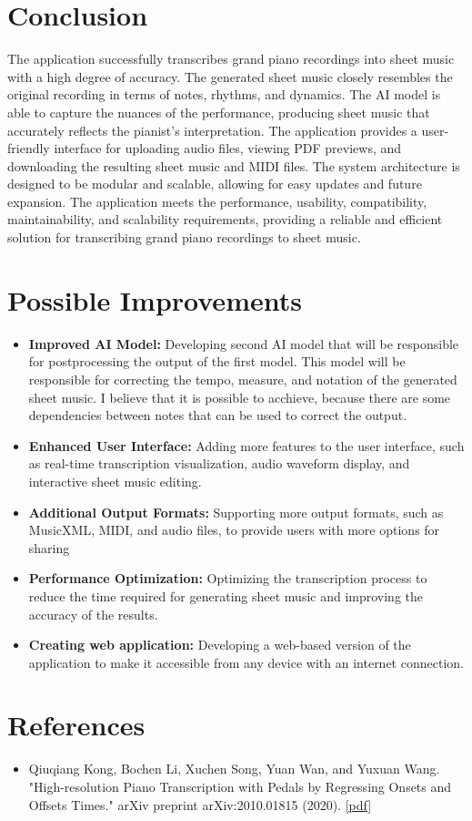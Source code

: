\documentclass{article}
\begin{document}
\section{Conclusion}
The application successfully transcribes grand piano recordings into sheet music with a high degree of accuracy. The generated sheet music closely resembles the original recording in terms of notes, rhythms, and dynamics. The AI model is able to capture the nuances of the performance, producing sheet music that accurately reflects the pianist's interpretation. The application provides a user-friendly interface for uploading audio files, viewing PDF previews, and downloading the resulting sheet music and MIDI files. The system architecture is designed to be modular and scalable, allowing for easy updates and future expansion. The application meets the performance, usability, compatibility, maintainability, and scalability requirements, providing a reliable and efficient solution for transcribing grand piano recordings to sheet music.

\FloatBarrier
\section{Possible Improvements}
\begin{itemize}
    \item \textbf{Improved AI Model:} Developing second AI model that will be responsible for postprocessing the output of the first model. This model will be responsible for correcting the tempo, measure, and notation of the generated sheet music. I believe that it is possible to acchieve, because there are some dependencies between notes that can be used to correct the output.
    \item \textbf{Enhanced User Interface:} Adding more features to the user interface, such as real-time transcription visualization, audio waveform display, and interactive sheet music editing.
    \item \textbf{Additional Output Formats:} Supporting more output formats, such as MusicXML, MIDI, and audio files, to provide users with more options for sharing
    \item \textbf{Performance Optimization:} Optimizing the transcription process to reduce the time required for generating sheet music and improving the accuracy of the results.
    \item \textbf{Creating web application:} Developing a web-based version of the application to make it accessible from any device with an internet connection.
\end{itemize}

\FloatBarrier
\section{References}
\begin{itemize}
    \item Qiuqiang Kong, Bochen Li, Xuchen Song, Yuan Wan, and Yuxuan Wang. "High-resolution Piano Transcription with Pedals by Regressing Onsets and Offsets Times." arXiv preprint arXiv:2010.01815 (2020). \href{https://arxiv.org/pdf/2010.01815.pdf}{[pdf]}
\end{itemize}
\end{document}
